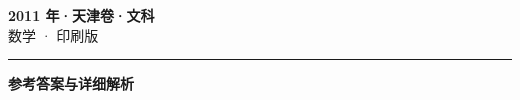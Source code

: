 \documentclass[zihao=5, a4paper]{ctexart}
\begin{document}
\begin{center}
  {\Large\bfseries 2011 年·天津卷·文科}\\[4pt]
  {\large 数学 · 印刷版}
\end{center}
\medskip
{}

\par\bigskip\hrule\bigskip
{}
\begin{center}{\large\bfseries 参考答案与详细解析}\end{center}
\smallskip

\end{document}
